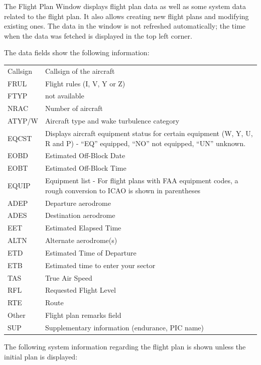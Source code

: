 \documentclass[11pt,a4paper,oldfontcommands]{memoir}
\begin{document}
The Flight Plan Window displays flight plan data as well as some system data related to the flight plan. It also allows creating new flight plans and modifying existing ones. The data in the window is not refreshed automatically; the time when the data was fetched is displayed in the top left corner.

The data fields show the following information:

\begin{tabular}{l l}
    Callsign    & Callsign of the aircraft\\
    FRUL        & Flight rules (I, V, Y or Z)\\
    FTYP        & not available\\
    NRAC        & Number of aircraft\\
    ATYP/W      & Aircraft type and wake turbulence category\\
    EQCST       & Displays aircraft equipment status for certain equipment (W, Y, U, R and P) - “EQ” equipped, “NO” not equipped, “UN” unknown.\\
    EOBD        & Estimated Off-Block Date\\
    EOBT        & Estimated Off-Block Time\\
    EQUIP       & Equipment list - For flight plans with FAA equipment codes, a rough conversion to ICAO is shown in parentheses\\
    ADEP        & Departure aerodrome\\
    ADES        & Destination aerodrome\\
    EET         & Estimated Elapsed Time\\
    ALTN        & Alternate aerodrome(s)\\
    ETD         & Estimated Time of Departure\\
    ETB         & Estimated time to enter your sector\\
    TAS         & True Air Speed\\
    RFL         & Requested Flight Level\\
    RTE         & Route\\
    Other       & Flight plan remarks field\\
    SUP         & Supplementary information (endurance, PIC name)\\
\end{tabular}

The following system information regarding the flight plan is shown unless the initial plan is displayed:
\end{document}
